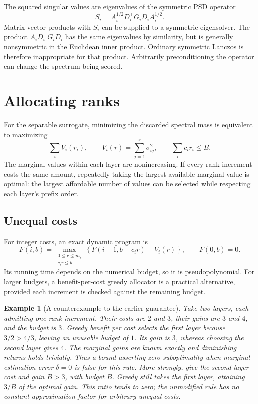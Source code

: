 \documentclass[11pt]{article}
\newtheorem{example}{Example}
\begin{document}
The squared singular values are eigenvalues of the symmetric PSD operator
\[
 S_i=A_i^{1/2}D_i^\top G_iD_iA_i^{1/2}.
\]
Matrix-vector products with $S_i$ can be supplied to a symmetric eigensolver.
The product $A_iD_i^\top G_iD_i$ has the same eigenvalues by similarity, but is
generally nonsymmetric in the Euclidean inner product. Ordinary symmetric
Lanczos is therefore inappropriate for that product. Arbitrarily preconditioning
the operator can change the spectrum being scored.

\section{Allocating ranks}

For the separable surrogate, minimizing the discarded spectral mass is
equivalent to maximizing
\[
 \sum_i V_i(r_i),\qquad
 V_i(r)=\sum_{j=1}^{r}\sigma_{ij}^2,
 \qquad \sum_i c_i r_i\leq B.
\]
The marginal values within each layer are nonincreasing. If every rank
increment costs the same amount, repeatedly taking the largest available
marginal value is optimal: the largest affordable number of values can be
selected while respecting each layer's prefix order.

\subsection{Unequal costs}

For integer costs, an exact dynamic program is
\[
 F(i,b)=\max_{\substack{0\leq r\leq m_i\\c_i r\leq b}}
       \left\{F(i-1,b-c_i r)+V_i(r)\right\},\qquad F(0,b)=0.
\]
Its running time depends on the numerical budget, so it is pseudopolynomial.
For larger budgets, a benefit-per-cost greedy allocator is a practical
alternative, provided each increment is checked against the remaining budget.

\begin{example}[A counterexample to the earlier guarantee]
Take two layers, each admitting one rank increment. Their costs are $2$ and
$3$, their gains are $3$ and $4$, and the budget is $3$. Greedy benefit per cost
selects the first layer because $3/2>4/3$, leaving an unusable budget of $1$.
Its gain is $3$, whereas choosing the second layer gives $4$.
The marginal gains are known exactly and diminishing returns holds trivially.
Thus a bound asserting zero suboptimality when marginal-estimation error
$\delta=0$ is false for this rule.
More strongly, give the second layer cost and gain $B>3$, with budget $B$.
Greedy still takes the first layer, attaining $3/B$ of the optimal gain.
This ratio tends to zero; the unmodified rule has no constant approximation
factor for arbitrary unequal costs.
\end{example}
\end{document}
